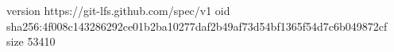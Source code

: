 version https://git-lfs.github.com/spec/v1
oid sha256:4f008c143286292ce01b2ba10277daf2b49af73d54bf1365f54d7c6b049872cf
size 53410
